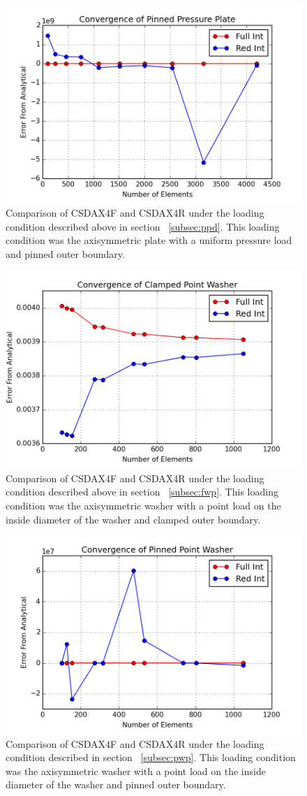 \documentclass[10pt,letterpaper]{report}
\numberwithin{equation}{chapter}
\begin{document}
\begin{figure}[H]
\centering
\includegraphics[width=0.7\linewidth]{./GoodImages/Conv_PlPrPi_1}
\caption[H refinement of CSDAX4F]{Comparison of CSDAX4F and CSDAX4R under the loading condition described above in section ~\ref{subsec:ppd}. This loading condition was the axisymmetric plate with a uniform pressure load and pinned outer boundary.}
\label{fig:Conv_PlPoCl_1}
\end{figure}

\begin{figure}[H]
\centering
\includegraphics[width=0.7\linewidth]{./GoodImages/Conv_WaPoCl_1}
\caption[H refinement of CSDAX4F]{Comparison of CSDAX4F and CSDAX4R under the loading condition described above in section ~\ref{subsec:fwp}. This loading condition was the axisymmetric washer with a point load on the inside diameter of the washer and clamped outer boundary.}
\label{fig:Conv_PlPoCl_1}
\end{figure}

\begin{figure}[H]
\centering
\includegraphics[width=0.7\linewidth]{./GoodImages/Conv_WaPoPi_1}
\caption[H refinement of CSDAX4F]{Comparison of CSDAX4F and CSDAX4R under the loading condition described in section ~\ref{subsec:pwp}.  This loading condition was the axisymmetric washer with a point load on the inside diameter of the washer and pinned outer boundary.}
\label{fig:Conv_PlPoCl_1}
\end{figure}
\end{document}
